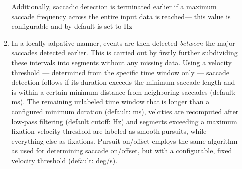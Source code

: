 \begin{enumerate}
\begin{enumerate}
 Additionally, saccadic detection is terminated earlier if a maximum saccade frequency across the entire input data is reached--- this value is configurable and by default is set to \unit[2]{Hz}
 
 \item In a locally adpative manner, events are then detected \textit{between} the major saccades detected earlier. This is carried out by firstly further subdividing these intervals into segments without any missing data. Using a velocity threshold --- determined from the specific time window only --- saccade detection follows if its duration exceeds the minimum saccade length and is within a certain minimum distance from neighboring saccades (default: \unit[130]{ms}). 
 The remaining unlabeled time window that is longer than a configured minimum duration (default: \unit[40]{ms}), velcities are recomputed after low-pass filtering (default cutoff: \unit[4]{Hz}) and segments exceeding a maximum fixation velocity threshold are labeled as smooth pursuits, while everything else as fixations. Pursuit on/offset employs the same algorithm as \citet{Nystrom2010AnData} used for determining saccade on/offset, but with a configurable, fixed velocity threshold (default: \unit[2]{deg/s}). 
   
\end{enumerate}
\end{enumerate}

